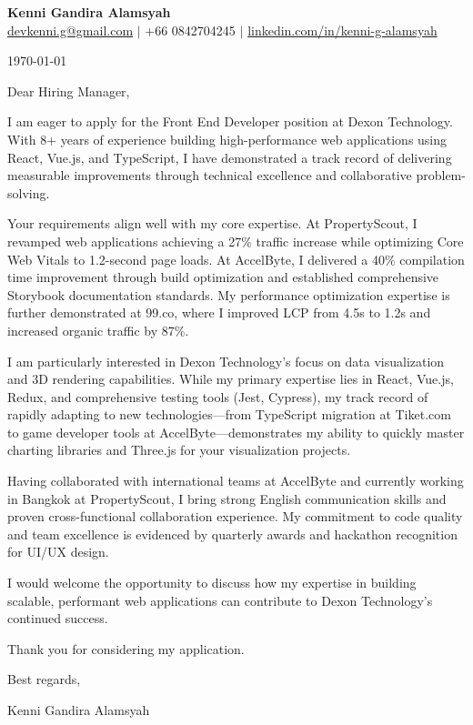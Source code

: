 \documentclass[11pt]{article}
\begin{document}
\begin{center}
  \textbf{\Large Kenni Gandira Alamsyah}\\
  \vspace{0.5em}
  \href{mailto:devkenni.g@gmail.com}{devkenni.g@gmail.com} $|$ +66 0842704245 $|$ \href{https://www.linkedin.com/in/kenni-g-alamsyah/}{linkedin.com/in/kenni-g-alamsyah}
\end{center}

\vspace{1em}

\today

\vspace{1em}

Dear Hiring Manager,

I am eager to apply for the Front End Developer position at Dexon Technology. With 8+ years of experience building high-performance web applications using React, Vue.js, and TypeScript, I have demonstrated a track record of delivering measurable improvements through technical excellence and collaborative problem-solving.

Your requirements align well with my core expertise. At PropertyScout, I revamped web applications achieving a 27\% traffic increase while optimizing Core Web Vitals to 1.2-second page loads. At AccelByte, I delivered a 40\% compilation time improvement through build optimization and established comprehensive Storybook documentation standards. My performance optimization expertise is further demonstrated at 99.co, where I improved LCP from 4.5s to 1.2s and increased organic traffic by 87\%.

I am particularly interested in Dexon Technology's focus on data visualization and 3D rendering capabilities. While my primary expertise lies in React, Vue.js, Redux, and comprehensive testing tools (Jest, Cypress), my track record of rapidly adapting to new technologies---from TypeScript migration at Tiket.com to game developer tools at AccelByte---demonstrates my ability to quickly master charting libraries and Three.js for your visualization projects.

Having collaborated with international teams at AccelByte and currently working in Bangkok at PropertyScout, I bring strong English communication skills and proven cross-functional collaboration experience. My commitment to code quality and team excellence is evidenced by quarterly awards and hackathon recognition for UI/UX design.

I would welcome the opportunity to discuss how my expertise in building scalable, performant web applications can contribute to Dexon Technology's continued success.

Thank you for considering my application.

\vspace{1em}

Best regards,

\vspace{1em}

Kenni Gandira Alamsyah
\end{document}
